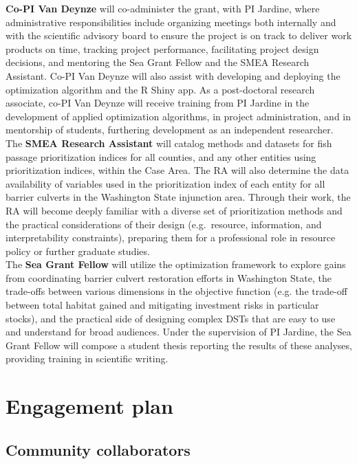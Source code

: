 \documentclass[12pt]{elsarticle}
\begin{document}
\textbf{Co-PI Van Deynze} will co-administer the grant, with PI Jardine, where administrative responsibilities include organizing meetings both internally and with the scientific advisory board to ensure the project is on track to deliver work products on time, tracking project performance, facilitating project design decisions, and mentoring the Sea Grant Fellow and the SMEA Research Assistant. Co-PI Van Deynze will also assist with developing and deploying the optimization algorithm and the R Shiny app. As a post-doctoral research associate, co-PI Van Deynze will receive training from PI Jardine in the development of applied optimization algorithms, in project administration, and in mentorship of students, furthering development as an independent researcher. \\

The \textbf{SMEA Research Assistant} will catalog methods and datasets for fish passage prioritization indices for all counties, and any other entities using prioritization indices, within the Case Area. The RA will also determine the data availability of variables used in the prioritization index of each entity for all barrier culverts in the Washington State injunction area. Through their work, the RA will become deeply familiar with a diverse set of prioritization methods and the practical considerations of their design (e.g.\ resource, information, and interpretability constraints), preparing them for a professional role in resource policy or further graduate studies. \\

The \textbf{Sea Grant Fellow} will utilize the optimization framework to explore gains from coordinating barrier culvert restoration efforts in Washington State, the trade-offs between various dimensions in the objective function (e.g. the trade-off between total habitat gained and mitigating investment risks in particular stocks), and the practical side of designing complex DSTs that are easy to use and understand for broad audiences. Under the supervision of PI Jardine, the Sea Grant Fellow will compose a student thesis reporting the results of these analyses, providing training in scientific writing. \\

%
\section{Engagement plan \label{sec:engage}}

\subsection*{Community collaborators} 
\end{document}
